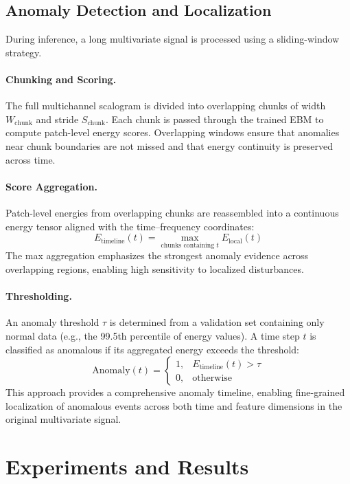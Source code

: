 \documentclass{article}
\begin{document}
\subsection{Anomaly Detection and Localization}

During inference, a long multivariate signal is processed using a sliding-window strategy.

\paragraph{Chunking and Scoring.}

The full multichannel scalogram is divided into overlapping chunks of width $W_{\text{chunk}}$ and stride $S_{\text{chunk}}$.
Each chunk is passed through the trained EBM to compute patch-level energy scores.
Overlapping windows ensure that anomalies near chunk boundaries are not missed and that energy continuity is preserved across time.

\paragraph{Score Aggregation.}\label{sec:score_aggregation}

Patch-level energies from overlapping chunks are reassembled into a continuous energy tensor aligned with the time–frequency coordinates:
\[ E_{\text{timeline}}(t) = \max_{\text{chunks containing } t} E_{\text{local}}(t) \]
The max aggregation emphasizes the strongest anomaly evidence across overlapping regions, enabling high sensitivity to localized disturbances.

\paragraph{Thresholding.}

An anomaly threshold $\tau$ is determined from a validation set containing only normal data (e.g., the 99.5th percentile of energy values).
A time step $t$ is classified as anomalous if its aggregated energy exceeds the threshold:
\[
\text{Anomaly}(t) =
\begin{cases}
1, & E_{\text{timeline}}(t) > \tau \\
0, & \text{otherwise}
\end{cases}
\]
This approach provides a comprehensive anomaly timeline, enabling fine-grained localization of anomalous events across both time and feature dimensions in the original multivariate signal.


\section{Experiments and Results}
\end{document}
